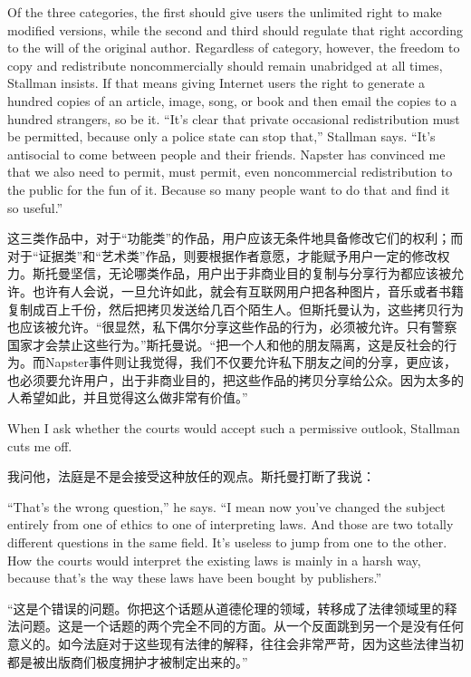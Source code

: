 \ifdefined\eng
Of the three categories, the first should give users the unlimited right to make modified versions, while the second and third should regulate that right according to the will of the original author. Regardless of category, however, the freedom to copy and redistribute noncommercially should remain unabridged at all times, Stallman insists. If that means giving Internet users the right to generate a hundred copies of an article, image, song, or book and then email the copies to a hundred strangers, so be it. ``It's clear that private occasional redistribution must be permitted, because only a police state can stop that,'' Stallman says. ``It's antisocial to come between people and their friends. Napster has convinced me that we also need to permit, must permit, even noncommercial redistribution to the public for the fun of it. Because so many people want to do that and find it so useful.''
\fi

\ifdefined\chs
这三类作品中，对于``功能类''的作品，用户应该无条件地具备修改它们的权利；而对于``证据类''和``艺术类''作品，则要根据作者意愿，才能赋予用户一定的修改权力。斯托曼坚信，无论哪类作品，用户出于非商业目的复制与分享行为都应该被允许。也许有人会说，一旦允许如此，就会有互联网用户把各种图片，音乐或者书籍复制成百上千份，然后把拷贝发送给几百个陌生人。但斯托曼认为，这些拷贝行为也应该被允许。``很显然，私下偶尔分享这些作品的行为，必须被允许。只有警察国家才会禁止这些行为。''斯托曼说。``把一个人和他的朋友隔离，这是反社会的行为。而Napster事件则让我觉得，我们不仅要允许私下朋友之间的分享，更应该，也必须要允许用户，出于非商业目的，把这些作品的拷贝分享给公众。因为太多的人希望如此，并且觉得这么做非常有价值。''
\fi

\ifdefined\eng
When I ask whether the courts would accept such a permissive outlook, Stallman cuts me off.
\fi

\ifdefined\chs
我问他，法庭是不是会接受这种放任的观点。斯托曼打断了我说：
\fi

\ifdefined\eng
``That's the wrong question,'' he says. ``I mean now you've changed the subject entirely from one of ethics to one of interpreting laws. And those are two totally different questions in the same field. It's useless to jump from one to the other. How the courts would interpret the existing laws is mainly in a harsh way, because that's the way these laws have been bought by publishers.''
\fi

\ifdefined\chs
``这是个错误的问题。你把这个话题从道德伦理的领域，转移成了法律领域里的释法问题。这是一个话题的两个完全不同的方面。从一个反面跳到另一个是没有任何意义的。如今法庭对于这些现有法律的解释，往往会非常严苛，因为这些法律当初都是被出版商们极度拥护才被制定出来的。''
\fi

